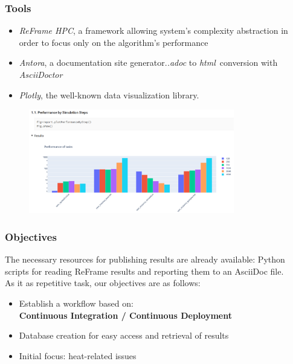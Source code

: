 \documentclass[10pt]{beamer}
\begin{document}
\begin{frame}
    \frametitle{\textbf{Tools}}
    \begin{itemize}
        \addtolength{\itemsep}{10pt}
        \item \textit{ReFrame HPC}, a framework allowing system's complexity abstraction in order to focus only on the algorithm's performance
        \item \textit{Antora}, a documentation site generator.\newline \textit{.adoc} to \textit{html}\ conversion with \textit{AsciiDoctor}
        \item \textit{Plotly}, the well-known data visualization library.
    \end{itemize}
    \begin{figure}
        \centering
        \includegraphics[width=0.8\textwidth]{../../illustrations/benchmarking-graphics.png}
      \end{figure}
\end{frame}


\begin{frame}
    \frametitle{\textbf{Objectives}}
    The necessary resources for publishing results are already available:
    Python scripts for reading ReFrame results and reporting them to an AsciiDoc file.\\
    As it as repetitive task, our objectives are as follows:\\
    [10pt]
    \begin{itemize}
        \addtolength{\itemsep}{10pt}
        \item Establish a workflow based on:\\
                [0.2cm]
                \textbf{Continuous Integration / Continuous Deployment}
        \item Database creation for easy access and retrieval of results
        \item Initial focus: heat-related issues
    \end{itemize}
\end{frame}
\end{document}
